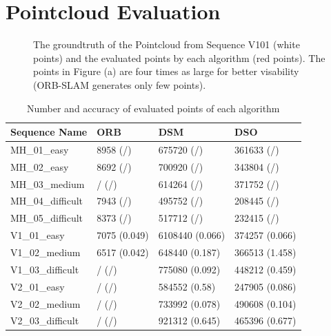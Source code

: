 \section{Pointcloud Evaluation}

	\begin{figure}%
    \centering
    \qquad
	\qquad
    \caption{The groundtruth of the Pointcloud from Sequence V101 (white points) and the evaluated points by each algorithm (red points). 
	The points in Figure (a) are four times as large for better visability (ORB-SLAM generates only few points). 
	}%
    \label{fig:pointcloud}%
	\end{figure}
	
	
	\begin{table}
	\caption{Number and accuracy of evaluated points of each algorithm}
	\begin{tabular}{ |p{3cm}||p{3cm}|p{3cm}|p{3cm}|  }
	\hline
	Sequence Name& ORB & DSM & DSO \\
	\hline
	MH\_01\_easy & 8958 (/) & 675720 (/) & 361633 (/)\\
	MH\_02\_easy & 8692 (/) & 700920 (/) & 343804 (/)\\
	MH\_03\_medium & / (/) & 614264 (/) & 371752 (/)\\
	MH\_04\_difficult & 7943 (/) & 495752 (/) & 208445 (/)\\
	MH\_05\_difficult & 8373 (/) & 517712 (/) & 232415 (/)\\
	V1\_01\_easy & 7075 (0.049) & 6108440 (0.066) & 374257 (0.066)\\
	V1\_02\_medium & 6517 (0.042) & 648440 (0.187) & 366513 (1.458)\\
	V1\_03\_difficult & / (/) & 775080 (0.092) & 448212 (0.459)\\
	V2\_01\_easy & / (/) & 584552 (0.58) & 247905 (0.086)\\
	V2\_02\_medium & / (/)& 733992 (0.078) & 490608 (0.104)\\
	V2\_03\_difficult & / (/) & 921312 (0.645) & 465396 (0.677)\\
	\hline
	\end{tabular}
	\label{table:pointcloud}
	\end{table}
	
